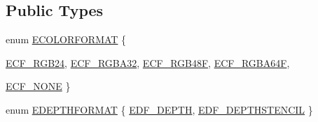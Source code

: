\subsection*{Public Types}
\begin{CompactItemize}
\item 
enum \hyperlink{class_gr_render_target_c5acf92ad0c41edbb66e9fc4b8a559a2}{ECOLORFORMAT} \{ \par
\hyperlink{class_gr_render_target_c5acf92ad0c41edbb66e9fc4b8a559a23753cf7ddd3e0fd090366eef6075e39d}{ECF\_\-RGB24}, 
\hyperlink{class_gr_render_target_c5acf92ad0c41edbb66e9fc4b8a559a2322aaf09acd20c017985b80a0e5b1a55}{ECF\_\-RGBA32}, 
\hyperlink{class_gr_render_target_c5acf92ad0c41edbb66e9fc4b8a559a2c9e360099b9539bfb56694c501d08cce}{ECF\_\-RGB48F}, 
\hyperlink{class_gr_render_target_c5acf92ad0c41edbb66e9fc4b8a559a23dad6189c4470b6bb102c2ac04f7ae60}{ECF\_\-RGBA64F}, 
\par
\hyperlink{class_gr_render_target_c5acf92ad0c41edbb66e9fc4b8a559a2a4b9e6669bb363a0a41092b21dec7c06}{ECF\_\-NONE}
 \}
\item 
enum \hyperlink{class_gr_render_target_6331f1f98584176a8d0e3c6c4795f07a}{EDEPTHFORMAT} \{ \hyperlink{class_gr_render_target_6331f1f98584176a8d0e3c6c4795f07a4b47d4a30a8ae3ddc30ccbaf9d6d02d5}{EDF\_\-DEPTH}, 
\hyperlink{class_gr_render_target_6331f1f98584176a8d0e3c6c4795f07a6d338feaeca1aeb33d5baaa5856df237}{EDF\_\-DEPTHSTENCIL}
 \}

\end{CompactItemize}
